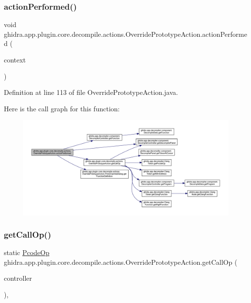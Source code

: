 \subsubsection{\texorpdfstring{actionPerformed()}{actionPerformed()}}
{\footnotesize\ttfamily void ghidra.\+app.\+plugin.\+core.\+decompile.\+actions.\+Override\+Prototype\+Action.\+action\+Performed (\begin{DoxyParamCaption}\item[{Action\+Context}]{context }\end{DoxyParamCaption})\hspace{0.3cm}{\ttfamily [inline]}}



Definition at line 113 of file Override\+Prototype\+Action.\+java.

Here is the call graph for this function\+:
\nopagebreak
\begin{figure}[H]
\begin{center}
\leavevmode
\includegraphics[width=350pt]{classghidra_1_1app_1_1plugin_1_1core_1_1decompile_1_1actions_1_1_override_prototype_action_af15dd916345bcdfb7c16df2dae48654f_cgraph}
\end{center}
\end{figure}
\mbox{\label{classghidra_1_1app_1_1plugin_1_1core_1_1decompile_1_1actions_1_1_override_prototype_action_aea2f7158a2f70a1c091ae54cd8bc85d7}} 
\subsubsection{\texorpdfstring{getCallOp()}{getCallOp()}}
{\footnotesize\ttfamily static \mbox{\hyperlink{class_pcode_op}{Pcode\+Op}} ghidra.\+app.\+plugin.\+core.\+decompile.\+actions.\+Override\+Prototype\+Action.\+get\+Call\+Op (\begin{DoxyParamCaption}\item[{\mbox{\hyperlink{classghidra_1_1app_1_1decompiler_1_1component_1_1_decompiler_controller}{Decompiler\+Controller}}}]{controller }\end{DoxyParamCaption})\hspace{0.3cm}{\ttfamily [inline]}, {\ttfamily [static]}}

